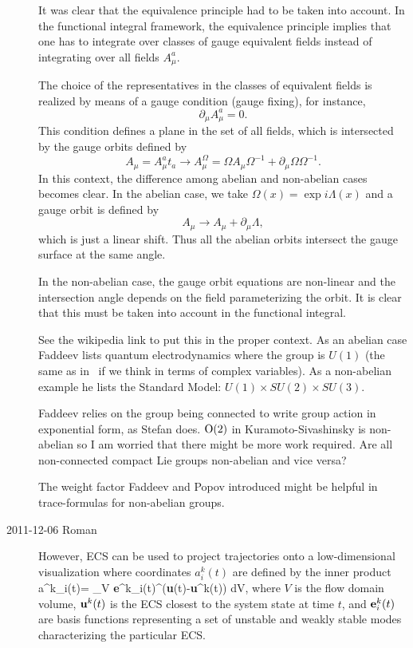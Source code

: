 \begin{description}
\begin{ttfamily}
It was clear that the equivalence principle had to be taken into account.
In the functional integral framework, the equivalence principle implies
that one has to integrate over classes of gauge equivalent fields instead
of integrating over all fields $A_\mu^a$.

The choice of the representatives in the classes of equivalent fields is
realized by means of a gauge condition (gauge fixing), for instance,
\[
    \partial_{\mu} A_{\mu}^{a} = 0 .
\]
This condition defines a plane in the set of all fields, which is
intersected by the gauge orbits defined by
\[
    A_{\mu} = A_{\mu}^{a}t_{a} \to A_{\mu}^{\Omega}
            = \Omega A_{\mu} \Omega^{-1} + \partial_{\mu} \Omega \Omega^{-1} .
\]
In this context, the difference among abelian and non-abelian cases
becomes clear. In the abelian case, we take $\Omega(x) =
\exp{i\Lambda(x)}$ and a gauge orbit is defined by
\[
    A_{\mu} \to A_{\mu} + \partial_{\mu} \Lambda ,
\]
which is just a linear shift. Thus all the abelian orbits intersect the
gauge surface at the same angle.

In the non-abelian case, the gauge orbit equations are non-linear and the
intersection angle depends on the field parameterizing the orbit. It is
clear that this must be taken into account in the functional integral.
\end{ttfamily}

See the wikipedia link to put this in the proper context. As an abelian
case Faddeev lists quantum electrodynamics where the group is $U(1)$ (the
same as in \cLe\ if we think in terms of complex variables). As a
non-abelian example he lists the Standard Model: $U(1)\times SU(2) \times
SU(3)$.

Faddeev relies on the group being connected to write group action in
exponential form, as Stefan does. $\textrm{O}(2)$ in Kuramoto-Sivashinsky is
non-abelian so I am worried that there might be more work required. Are
all non-connected compact Lie groups non-abelian and vice versa?

The weight factor Faddeev and Popov introduced might be helpful in
trace-formulas for non-abelian groups.

\item[2011-12-06 Roman] However,  ECS can be used to project
trajectories onto a low-dimensional visualization where coordinates $a^k_{i}(t)$
are defined by the inner product
\beq
\label{coordinatesRG}
a^k_{i}(t)=  \int_V {\bf e}^k_i(t)^\dagger\cdot({\bf u}(t)-{\bf u}^k(t)) dV,
\eeq
where $V$ is the flow domain volume, ${\bf u}^k(t)$ is the ECS closest to
the system state at time $t$, and ${\bf e}^k_i(t)$ are basis functions
representing a set of unstable and weakly stable modes characterizing the
particular ECS.


\end{description}
